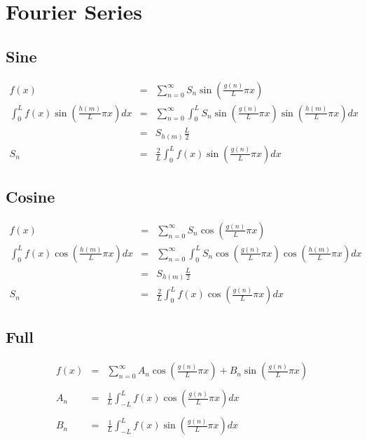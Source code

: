 \documentclass[12pt]{article}
\begin{document}
\section{Fourier Series}
\subsection{Sine}
	\begin{eqnarray*}
	 	f(x) &=& \displaystyle\sum\limits_{n = 0}^{\infty} S_n \sin\left(\frac{g(n)}{L}\pi x \right) \\
	 	\displaystyle \int_{0}^{L} f(x)\sin\left(\frac{h(m)}{L}\pi x\right) dx &=& \sum\limits_{n = 0}^{\infty} \int_{0}^{L} S_n \sin\left(\frac{g(n)}{L}\pi x \right) \sin\left(\frac{h(m)}{L}\pi x\right) dx \\
		&=& S_{h(m)} \frac{L}{2} \\
		S_n &=&  \displaystyle \frac{2}{L} \int_{0}^{L} f(x)\sin\left(\frac{g(n)}{L}\pi x\right) dx
	\end{eqnarray*}
\subsection{Cosine}
	\begin{eqnarray*}
		f(x) &=& \displaystyle\sum\limits_{n = 0}^{\infty} S_n \cos\left(\frac{g(n)}{L}\pi x \right) \\
	 	\displaystyle \int_{0}^{L} f(x)\cos\left(\frac{h(m)}{L}\pi x\right) dx &=& \sum\limits_{n = 0}^{\infty} \int_{0}^{L} S_n \cos\left(\frac{g(n)}{L}\pi x \right) \cos\left(\frac{h(m)}{L}\pi x\right) dx \\
		&=& S_{h(m)} \frac{L}{2} \\
		S_n &=&  \displaystyle \frac{2}{L} \int_{0}^{L} f(x)\cos\left(\frac{g(n)}{L}\pi x\right) dx
	\end{eqnarray*}
\subsection{Full}
	\begin{eqnarray*}
		f(x) &=& \displaystyle\sum\limits_{n = 0}^{\infty} A_n \cos\left(\frac{g(n)}{L}\pi x \right) + B_n \sin \left( \frac{g(n)}{L} \pi x \right) \\ \\
		A_n &=&  \displaystyle \frac{1}{L} \int_{-L}^{L} f(x)\cos\left(\frac{g(n)}{L}\pi x\right) dx \\ \\
		B_n &=&  \displaystyle \frac{1}{L} \int_{-L}^{L} f(x)\sin\left(\frac{g(n)}{L}\pi x\right) dx \\ \\ \\ \\
	\end{eqnarray*}
\end{document}
